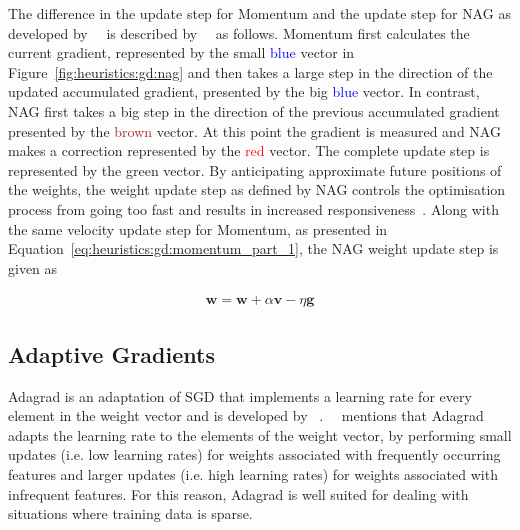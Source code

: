 The difference in the update step for \acs{Momentum} and the update step for \acs{NAG} as developed by~\citeauthor{ref:sutskever:2013}~\cite{ref:sutskever:2013} is described by~\citeauthor{ref:ruder:2016}~\cite{ref:ruder:2016} as follows. \acs{Momentum} first calculates the current gradient, represented by the small \textcolor{blue}{blue} vector in Figure~\ref{fig:heuristics:gd:nag} and then takes a large step in the direction of the updated accumulated gradient, presented by the big \textcolor{blue}{blue} vector. In contrast, \acs{NAG} first takes a big step in the direction of the previous accumulated gradient presented by the \textcolor{brown}{brown} vector. At this point the gradient is measured and \acs{NAG} makes a correction represented by the \textcolor{red}{red} vector. The complete update step is represented by the green vector. By anticipating approximate future positions of the weights, the weight update step as defined by \acs{NAG} controls the optimisation process from going too fast and results in increased responsiveness~\cite{ref:bengio:2013}. Along with the same velocity update step for \acs{Momentum}, as presented in Equation~\eqref{eq:heuristics:gd:momentum_part_1}, the \acs{NAG} weight update step is given as

\begin{equation}
	\label{eq:heuristics:gd:nag_part_2}
	\begin{split}
		\boldsymbol{w} = \boldsymbol{w} + \alpha \boldsymbol{v} - \eta \boldsymbol{g}
	\end{split}
\end{equation}


\subsection{Adaptive Gradients}\label{sec:heuristics:adagrad}

\Acf{Adagrad} is an adaptation of \acs{SGD} that implements a learning rate for every element in the weight vector and is developed by \citeauthor{ref:duchi:2011}~\cite{ref:duchi:2011}.~\citeauthor{ref:ruder:2016}~\cite{ref:ruder:2016} mentions that \acs{Adagrad} adapts the learning rate to the elements of the weight vector, by  performing small updates (i.e. low learning rates) for weights associated with frequently occurring features and larger updates (i.e. high learning rates) for weights associated with infrequent features. For this reason, \acs{Adagrad} is well suited for dealing with situations where training data is sparse.

